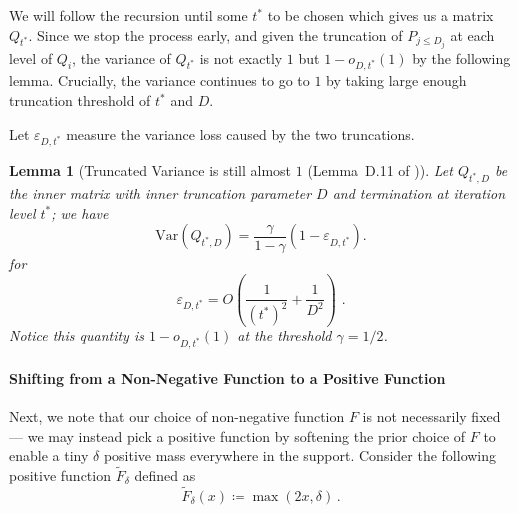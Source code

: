 \documentclass[12pt]{article}
\newcommand{\Var}{\mathrm{Var}}
\newtheorem{lemma}[theorem]{Lemma}
\newcommand{\calB}{\mathcal{B}}
\newcommand{\gam}{\gamma}
\newcommand{\Authornote}[3]{{\sf\footnotesize\color{#3}{[#1: #2]}}}
\newcommand{\Authornote}[3]{}
\newcommand{\jnote}[1]{\Authornote{Jeff}{#1}{blue}}
\begin{document}
We will follow the recursion until some $t^*$ to be chosen which gives %
us a matrix $Q_{t^*}$. Since we stop the process early, and given the truncation of $P_{j\leq D_j}$ at each level of $Q_i$,  the variance of $Q_{t^*}$ is not exactly $1$ but $1-o_{D,t^*}(1) $ by the following lemma. Crucially, the variance continues to go to $1$ by taking large enough truncation threshold of $t^*$ and $D$.



Let \(\varepsilon_{D,t^*}\) measure the variance loss caused by the two
truncations.
\begin{lemma}[Truncated Variance is still almost $1$ (Lemma~D.11 of \cite{PotechinXu2026Theta})
] 
\label{lem:truncated-var-damage}
Let $Q_{t^*,D}$ be the inner matrix with inner truncation parameter $D$ and termination at iteration level $t^*$; we have
\[
 \Var(Q_{t^*,D} ) = \frac{\gam}{1-\gamma}\left( 1 - \varepsilon_{D,t^*} \right).
\]
for \[ 
\varepsilon_{D,t^*} = O( \frac{1}{(t^*)^2} + \frac{1}{D^2})\,\,.
\]
Notice this quantity is $1-o_{D,t^*}(1)$ at the threshold $\gamma=1/2$.
\end{lemma}
 
 
 
\paragraph{Shifting from a Non-Negative Function to a Positive Function}

Next, we note that our choice of non-negative function $F$ is not necessarily fixed --- we may instead pick a positive function by softening the prior choice of $F$ to enable a tiny $\delta$ positive mass everywhere in the support.
Consider the following positive function $\widetilde{F}_\delta$ defined as \[
   \widetilde{F}_\delta(x) \coloneqq  \max(2x, \delta)\,.
\]
\end{document}
